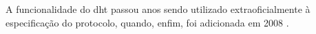 \begin{figure}[H]
    \centering
\end{figure}

A funcionalidade do \gls*{dht} passou anos sendo utilizado extraoficialmente à
especificação do protocolo, quando, enfim, foi adicionada em 2008
\cite{site:bittorrent-dht}.

